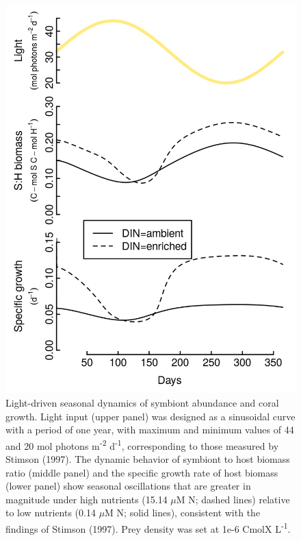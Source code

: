 \documentclass[]{elsarticle} %
\makeatletter
\def\maxwidth{\ifdim\Gin@nat@width>\linewidth\linewidth
\else\Gin@nat@width\fi}
\let\Oldincludegraphics\includegraphics
\renewcommand{\includegraphics}[1]{\Oldincludegraphics[width=\maxwidth]{#1}}
\makeatother
\begin{document}
\begin{figure}[htbp]
\centering
\includegraphics{../img/Fig5.png}
\caption{Light-driven seasonal dynamics of symbiont abundance and coral
growth. Light input (upper panel) was designed as a sinusoidal curve
with a period of one year, with maximum and minimum values of 44 and 20
mol photons m\textsuperscript{-2} d\textsuperscript{-1}, corresponding
to those measured by Stimson (1997). The dynamic behavior of symbiont to
host biomass ratio (middle panel) and the specific growth rate of host
biomass (lower panel) show seasonal oscillations that are greater in
magnitude under high nutrients (15.14 \(\mu\)M N; dashed lines) relative
to low nutrients (0.14 \(\mu\)M N; solid lines), consistent with the
findings of Stimson (1997). Prey density was set at 1e-6 CmolX
L\textsuperscript{-1}.}
\end{figure}
\end{document}

